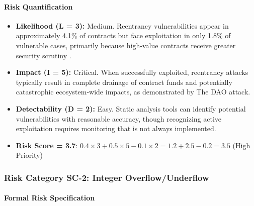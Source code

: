 \paragraph{Risk Quantification}

\begin{itemize}
\item \textbf{Likelihood (L = 3):} Medium. Reentrancy vulnerabilities appear in approximately 4.1\% of contracts but face exploitation in only 1.8\% of vulnerable cases, primarily because high-value contracts receive greater security scrutiny \cite{perez2021analysis}.

\item \textbf{Impact (I = 5):} Critical. When successfully exploited, reentrancy attacks typically result in complete drainage of contract funds and potentially catastrophic ecosystem-wide impacts, as demonstrated by The DAO attack.

\item \textbf{Detectability (D = 2):} Easy. Static analysis tools can identify potential vulnerabilities with reasonable accuracy, though recognizing active exploitation requires monitoring that is not always implemented.

\item \textbf{Risk Score = 3.7}: $0.4 \times 3 + 0.5 \times 5 - 0.1 \times 2 = 1.2 + 2.5 - 0.2 = 3.5$ (High Priority)
\end{itemize}

\subsubsection{Risk Category SC-2: Integer Overflow/Underflow}

\paragraph{Formal Risk Specification}

